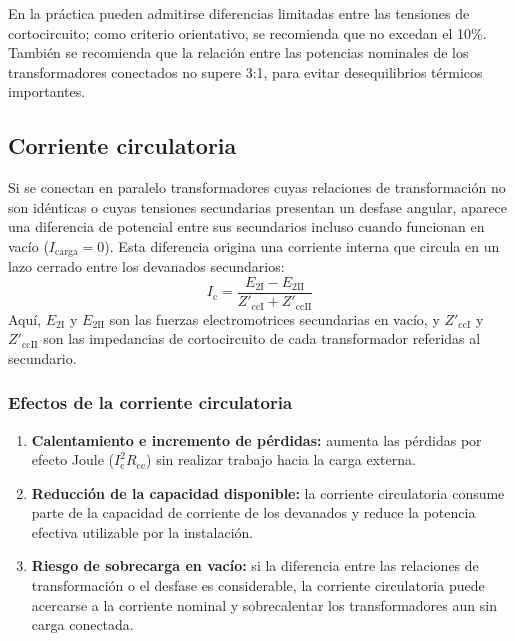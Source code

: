 \documentclass[12pt]{article}
\begin{document}
En la pr\'actica pueden admitirse diferencias limitadas entre las tensiones de cortocircuito; como criterio orientativo, se recomienda que no excedan el 10\%. Tambi\'en se recomienda que la relaci\'on entre las potencias nominales de los transformadores conectados no supere 3:1, para evitar desequilibrios t\'ermicos importantes.

\subsection{Corriente circulatoria}

Si se conectan en paralelo transformadores cuyas relaciones de transformaci\'on no son id\'enticas o cuyas tensiones secundarias presentan un desfase angular, aparece una diferencia de potencial entre sus secundarios incluso cuando funcionan en vac\'io ($I_{\mathrm{carga}}=0$). Esta diferencia origina una corriente interna que circula en un lazo cerrado entre los devanados secundarios:
\begin{equation}
    I_{\mathrm{c}} = \frac{E_{2\mathrm{I}}-E_{2\mathrm{II}}}{Z'_{\mathrm{ccI}}+Z'_{\mathrm{ccII}}}
\end{equation}
Aqu\'i, $E_{2\mathrm{I}}$ y $E_{2\mathrm{II}}$ son las fuerzas electromotrices secundarias en vac\'io, y $Z'_{\mathrm{ccI}}$ y $Z'_{\mathrm{ccII}}$ son las impedancias de cortocircuito de cada transformador referidas al secundario.

\subsubsection{Efectos de la corriente circulatoria}
\begin{enumerate}
    \item \textbf{Calentamiento e incremento de p\'erdidas:} aumenta las p\'erdidas por efecto Joule ($I_{\mathrm{c}}^2R_{\mathrm{cc}}$) sin realizar trabajo hacia la carga externa.
    \item \textbf{Reducci\'on de la capacidad disponible:} la corriente circulatoria consume parte de la capacidad de corriente de los devanados y reduce la potencia efectiva utilizable por la instalaci\'on.
    \item \textbf{Riesgo de sobrecarga en vac\'io:} si la diferencia entre las relaciones de transformaci\'on o el desfase es considerable, la corriente circulatoria puede acercarse a la corriente nominal y sobrecalentar los transformadores aun sin carga conectada.
\end{enumerate}
\end{document}
